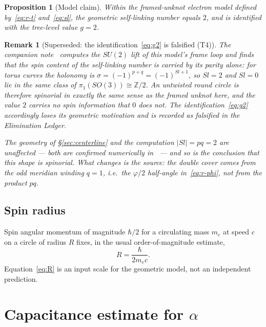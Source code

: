 \documentclass[11pt,a4paper]{article}
\newtheorem{proposition}{Proposition}
\newtheorem{remark}{Remark}
\begin{document}
\begin{proposition}[Model claim]
Within the framed-unknot electron model defined by~\eqref{eq:r-t}
and~\eqref{eq:sl}, the geometric self-linking number equals $2$, and is
identified with the tree-level value $g=2$.
\end{proposition}

\begin{remark}[Superseded: the identification~\eqref{eq:g2} is falsified (T4)]
\label{rem:superseded}
The companion note~\cite{framingtransformer2026} computes the $SU(2)$
lift of this model's frame loop and finds that the spin content of the
self-linking number is carried by its \emph{parity} alone: for torus
curves the holonomy is $\sigma = (-1)^{p+q} = (-1)^{Sl+1}$, so
$Sl = 2$ and $Sl = 0$ lie in the same class of
$\pi_1(SO(3)) \cong \mathbb{Z}/2$.  An untwisted round circle is
therefore spinorial in exactly the same sense as the framed unknot here,
and the \emph{value} $2$ carries no spin information that $0$ does not.
The identification~\eqref{eq:g2} accordingly loses its geometric
motivation and is recorded as falsified in the Elimination Ledger.

The geometry of \S\ref{sec:centerline} and the computation
$|Sl| = pq = 2$ are unaffected --- both are confirmed numerically
in~\cite{framingtransformer2026} --- and so is the conclusion that this
shape is spinorial.  What changes is the \emph{source}: the double cover
comes from the odd meridian winding $q = 1$, i.e.\ the $\varphi/2$
half-angle in~\eqref{eq:r-phi}, not from the product $pq$.
\end{remark}

\subsection{Spin radius}

Spin angular momentum of magnitude $\hbar/2$ for a circulating mass $m_e$
at speed $c$ on a circle of radius $R$ fixes, in the usual order-of-magnitude
estimate,
\begin{equation}
\label{eq:R}
R = \frac{\hbar}{2 m_e c}.
\end{equation}
Equation~\eqref{eq:R} is an input scale for the geometric model, not an
independent prediction.

\section{Capacitance estimate for $\alpha$}
\label{sec:alpha}
\end{document}
